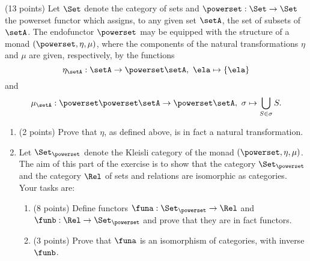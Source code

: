 \documentclass[paper=8.125in:10.250in,pagesize=pdftex,
    headinclude=false,footinclude=false,oneside,egregdoesnotlikesansseriftitles]{kaobook}
\begin{document}
\begin{gradedexercise}\label{ex:RelKleisli}
(13 points) Let $\Set$ denote the category of sets and $\powerset : \Set \to \Set$ the powerset functor which assigns, to any given set $\setA$, the set of subsets of $\setA$. The endofunctor $\powerset$ may be equipped with the structure of a monad $(\powerset, \eta, \mu)$, where the components of the natural transformations $\eta$ and $\mu$ are given, respectively, by the functions
$$ \eta_{\setA} : \setA \to \powerset \setA, \ \ela \mapsto \{ \ela \}$$
and
$$ \mu_{\setA} : \powerset \powerset \setA \to \powerset \setA, \ \sigma \mapsto \bigcup_{S \in \sigma} S.$$

\begin{enumerate}
\item (2 points) Prove that $\eta$, as defined above, is in fact a natural transformation. 
\item Let $\Set_{\powerset}$ denote the Kleisli category of the monad $(\powerset, \eta, \mu)$. The aim of this part of the exercise is to show that the category $\Set_{\powerset}$ and the category $\Rel$ of sets and relations are isomorphic as categories. Your tasks are:
\begin{enumerate}
\item (8 points) Define functors $\funa: \Set_{\powerset} \to \Rel$ and $\funb: \Rel \to \Set_{\powerset}$ and prove that they are in fact functors. 
\item (3 points) Prove that $\funa$ is an isomorphism of categories, with inverse $\funb$. 
\end{enumerate}
\end{enumerate}
\end{gradedexercise}


\newpage
\end{document}
